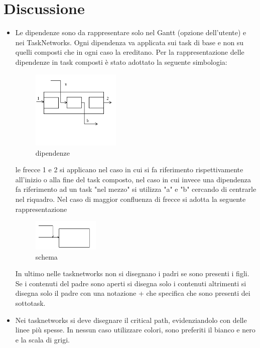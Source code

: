 \section*{Discussione}
\begin{itemize}
  \item Le dipendenze sono da rappresentare solo nel Gantt (opzione dell'utente) e nei TaskNetworks.
	 Ogni dipendenza va applicata sui task di base e non su quelli composti che in ogni caso
	 la ereditano.
	 Per la rappresentazione delle dipendenze in task composti è stato adottato la seguente simbologia:
	 \begin{figure}[h!] 
				\centering 
				\includegraphics[width=0.4\textwidth]{img1.png} 
				\caption{dipendenze}
				\label{fig:dipendenze}			
			\end{figure}
	 le frecce 1 e 2 si applicano nel caso in cui si fa riferimento rispettivamente all'inizio o alla fine
	 del task composto, nel caso in cui invece una dipendenza fa riferimento ad un task "nel mezzo" si utilizza "a" e "b"
	 cercando di centrarle nel riquadro.
	 Nel caso di maggior confluenza di frecce si adotta la seguente rappresentazione
	 \begin{figure}[h!] 
				\centering 
				\includegraphics[width=0.3\textwidth]{img2.png} 
				\caption{schema}
				\label{fig:schema}			
			\end{figure}
	 In ultimo nelle tasknetworks non si disegnano i padri se sono presenti i figli.
	 Se i contenuti del padre sono aperti si disegna solo i contenuti altrimenti si disegna solo il padre con una notazione 
	 + che specifica che sono presenti dei sottotask.

  \item Nei tasknetworks si deve disegnare il critical path, evidenziandolo con delle linee più spesse.
	 In nessun caso utilizzare colori, sono preferiti il bianco e nero e la scala di grigi.	 
 
\end{itemize}
 	 
